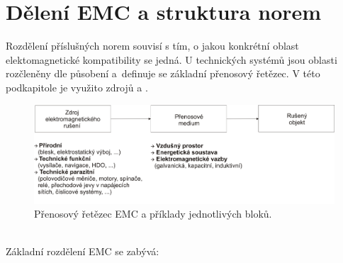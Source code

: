 \section{Dělení EMC a struktura norem}
Rozdělení příslušných norem souvisí s tím, o jakou konkrétní oblast elektomagnetické kompatibility se jedná. U technických systémů jsou oblasti rozčleněny dle působení a~definuje se základní přenosový řetězec. V této podkapitole je využito zdrojů \cite{nfr} a \cite{emc_encyklopedie}.
\begin{figure}[!h]
	\centering
	\includegraphics[width=14.6cm]{emc_retezec.png}
	\caption{Přenosový řetězec EMC a příklady jednotlivých bloků.}
	\label{obr:emc_retezec}
\end{figure}\\
Základní rozdělení EMC se zabývá:
